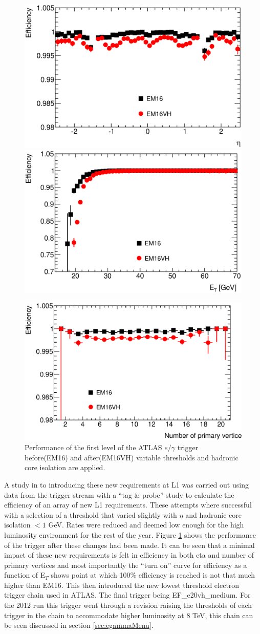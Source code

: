 		\begin{figure}[h!]
			\centering
				\includegraphics[width=0.49\linewidth]{images/L1_EM16VH_TandP_eff_vs_eta.eps}
				\includegraphics[width=0.49\linewidth]{images/L1_EM16VH_TandP_eff_vs_Et.eps}

				\includegraphics[width=0.49\linewidth]{images/L1_EM16VH_TandP_eff_vs_pvx.eps}
			\caption{Performance of the first level of the ATLAS $e/\gamma$ trigger before(EM16) and after(EM16VH) variable thresholds and hadronic core isolation are applied.}
			\label{fig:L1}
		\end{figure}

		A study in to introducing these new requirements \cite{} at L1 was carried out using data from the trigger stream with a ``tag \& probe'' study to calculate the efficiency of an array of new L1 requirements. These attempts where successful with a selection of a threshold that varied slightly with $\eta$ and hadronic core isolation $< 1$ GeV. Rates were reduced and deemed low enough for the high luminosity environment for the rest of the year. Figure \ref{fig:L1} shows the performance of the trigger after these changes had been made. It can be seen that a minimal impact of these new requirements is felt in efficiency in both eta and number of primary vertices and most importantly the ``turn on'' curve for efficiency as a function of E$_{T}$ shows point at which 100\% efficiency is reached is not that much higher than EM16. This then introduced the new lowest threshold electron trigger chain used in ATLAS. The final trigger being EF\_e20vh\_medium. For the 2012 run this trigger went through a revision raising the thresholds of each trigger in the chain to accommodate higher luminosity at 8 TeV, this chain can be seen discussed in section \ref{sec:egammaMenu}.

